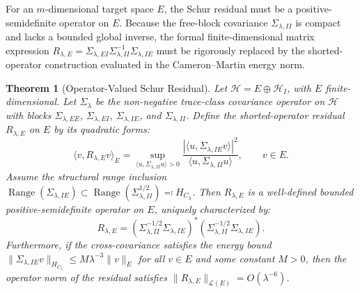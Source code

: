 \documentclass[11pt]{amsart}
\theoremstyle{plain}
\newtheorem{theorem}{Theorem}
\theoremstyle{definition}
\theoremstyle{remark}
\begin{document}
For an $m$-dimensional target space $E$, the Schur residual must be a positive-semidefinite operator on $E$. Because the free-block covariance $\Sigma_{\lambda,II}$ is compact and lacks a bounded global inverse, the formal finite-dimensional matrix expression $R_{\lambda,E} = \Sigma_{\lambda,EI}\Sigma_{\lambda,II}^{-1}\Sigma_{\lambda,IE}$ must be rigorously replaced by the shorted-operator construction evaluated in the Cameron--Martin energy norm.

\begin{theorem}[Operator-Valued Schur Residual]
  \label{thm:operator_residual}
  Let $\mathcal{H} = E \oplus \mathcal{H}_I$, with $E$ finite-dimensional. Let $\Sigma_\lambda$ be the non-negative trace-class covariance operator on $\mathcal{H}$ with blocks $\Sigma_{\lambda,EE}$, $\Sigma_{\lambda,EI}$, $\Sigma_{\lambda,IE}$, and $\Sigma_{\lambda,II}$. Define the shorted-operator residual $R_{\lambda,E}$ on $E$ by its quadratic forms:
  \begin{equation}
    \label{eq:discussion_operator_residual_form}
    \langle v,R_{\lambda,E}v\rangle_E
    =
    \sup_{\langle u,\Sigma_{\lambda,II}u\rangle>0}
    \frac{|\langle u,\Sigma_{\lambda,IE}v\rangle|^2}
         {\langle u,\Sigma_{\lambda,II}u\rangle},
    \qquad v\in E.
  \end{equation}
  Assume the structural range inclusion $\operatorname{Range}(\Sigma_{\lambda,IE}) \subset \operatorname{Range}(\Sigma_{\lambda,II}^{1/2}) \eqqcolon H_{C_\lambda}$. Then $R_{\lambda,E}$ is a well-defined bounded positive-semidefinite operator on $E$, uniquely characterized by:
  \begin{equation}
    R_{\lambda,E} = (\Sigma_{\lambda,II}^{-1/2}\Sigma_{\lambda,IE})^* (\Sigma_{\lambda,II}^{-1/2}\Sigma_{\lambda,IE}).
  \end{equation}
  Furthermore, if the cross-covariance satisfies the energy bound $\|\Sigma_{\lambda,IE} v\|_{H_{C_\lambda}} \le M \lambda^{-3} \|v\|_E$ for all $v \in E$ and some constant $M > 0$, then the operator norm of the residual satisfies $\|R_{\lambda,E}\|_{\mathcal{L}(E)} = O(\lambda^{-6})$.
\end{theorem}
\end{document}
